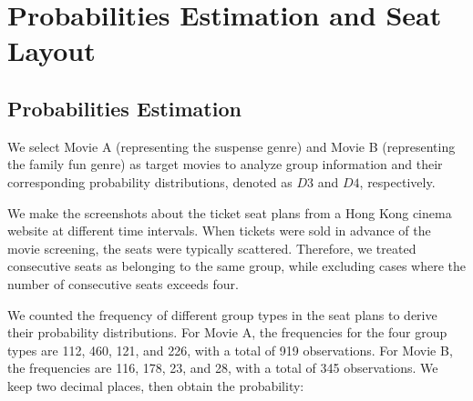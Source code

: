 \section{Probabilities Estimation and Seat Layout}\label{appen_3}
\subsection{Probabilities Estimation}
We select Movie A (representing the suspense genre) and Movie B (representing the family fun genre) as target movies to analyze group information and their corresponding probability distributions, denoted as $D3$ and $D4$, respectively.














We make the screenshots about the ticket seat plans from a Hong Kong cinema website at different time intervals. When tickets were sold in advance of the movie screening, the seats were typically scattered. Therefore, we treated consecutive seats as belonging to the same group, while excluding cases where the number of consecutive seats exceeds four. 

We counted the frequency of different group types in the seat plans to derive their probability distributions. For Movie A, the frequencies for the four group types are 112, 460, 121, and 226, with a total of 919 observations. For Movie B, the frequencies are 116, 178, 23, and 28, with a total of 345 observations. We keep two decimal places, then obtain the probability:

